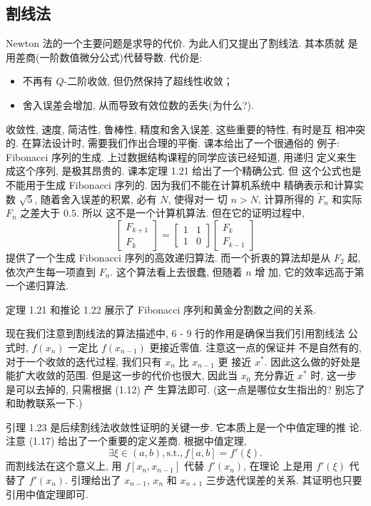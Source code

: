 \documentclass[a4paper]{ctexart}
\begin{document}
\subsection{割线法}

Newton 法的一个主要问题是求导的代价. 为此人们又提出了割线法. 其本质就
是用差商(一阶数值微分公式)代替导数. 代价是:
\begin{itemize}
\item 不再有 $Q$-二阶收敛, 但仍然保持了超线性收敛；
\item 舍入误差会增加, 从而导致有效位数的丢失(为什么?).
\end{itemize}
收敛性, 速度, 简洁性, 鲁棒性, 精度和舍入误差, 这些重要的特性, 有时是互
相冲突的. 在算法设计时, 需要我们作出合理的平衡. 课本给出了一个很通俗的
例子: Fibonacci 序列的生成. 上过数据结构课程的同学应该已经知道, 用递归
定义来生成这个序列, 是极其昂贵的. 课本定理 1.21 给出了一个精确公式. 但
这个公式也是不能用于生成 Fibonacci 序列的. 因为我们不能在计算机系统中
精确表示和计算实数 $\sqrt{5}$, 随着舍入误差的积累, 必有 $N$, 使得对一
切 $n > N$, 计算所得的 $\tilde{F}_n$ 和实际 $F_n$ 之差大于 $0.5$. 所以
这不是一个计算机算法. 但在它的证明过程中,
\[
  \left[\begin{array}{c}F_{k + 1} \\ F_k\end{array}\right]
  = \left[\begin{array}{cc}1 & 1 \\ 1 & 0\end{array}\right]
  \left[\begin{array}{c}F_k \\ F_{k - 1}\end{array}\right]
\]
提供了一个生成 Fibonacci 序列的高效递归算法. 而一个折衷的算法却是从
$F_2$ 起, 依次产生每一项直到 $F_n$. 这个算法看上去很蠢, 但随着 $n$ 增
加, 它的效率远高于第一个递归算法.

定理 1.21 和推论 1.22 展示了 Fibonacci 序列和黄金分割数之间的关系.

现在我们注意到割线法的算法描述中, 6 - 9 行的作用是确保当我们引用割线法
公式时, $f(x_n)$ 一定比 $f(x_{n - 1})$ 更接近零值. 注意这一点的保证并
不是自然有的, 对于一个收敛的迭代过程, 我们只有 $x_n$ 比 $x_{n - 1}$ 更
接近 $x^*$. 因此这么做的好处是能扩大收敛的范围. 但是这一步的代价也很大,
因此当 $x_0$ 充分靠近 $x^*$ 时, 这一步是可以去掉的, 只需根据 (1.12) 产
生算法即可. (这一点是哪位女生指出的? 别忘了和助教联系一下.)

引理 1.23 是后续割线法收敛性证明的关键一步. 它本质上是一个中值定理的推
论. 注意 (1.17) 给出了一个重要的定义差商. 根据中值定理,
$$\exists \xi \in (a, b), \mathrm{s. t.},
f[a, b] = f'(\xi).
$$
而割线法在这个意义上, 用 $f[x_n, x_{n - 1}]$ 代替 $f'(x_n)$, 在理论
上是用 $f'(\xi)$ 代替了 $f'(x_n)$. 引理给出了 $x_{n - 1}$, $x_n$ 和
$x_{n + 1}$ 三步迭代误差的关系. 其证明也只要引用中值定理即可. 
\end{document}

